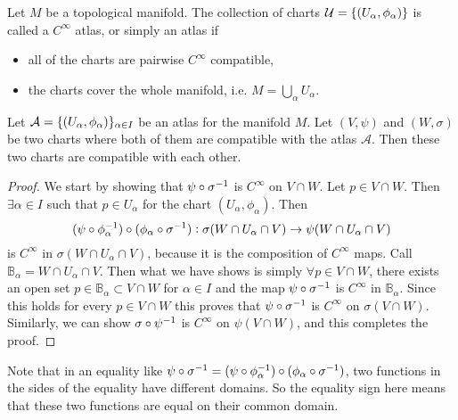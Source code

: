 \begin{definition}
	Let $ M $ be a topological manifold. The collection of charts $ \mathcal{U} = \{(U_\alpha, \phi_\alpha)\} $ is called a $ C^\infty $ atlas, or simply an atlas if 
	\begin{itemize}
		\item all of the charts are pairwise $ C^\infty $ compatible,
		\item the charts cover the whole manifold, i.e. $ M = \bigcup_\alpha U_\alpha $.
	\end{itemize}
\end{definition}

\begin{lemma}
	Let $ \mathcal{A} = \{(U_\alpha,\phi_\alpha)\}_{\alpha \in I} $ be an atlas for the manifold $ M $. Let $ (V,\psi) $ and $ (W,\sigma) $ be two charts where both of them are compatible with the atlas $ \mathcal{A} $. Then these two charts are compatible with each other.
\end{lemma}

\begin{proof}
	We start by showing that $ \psi\circ \sigma^{-1} $ is $ C^\infty $ on $ V\cap W $. Let $ p \in V \cap W $. Then $ \exists \alpha \in I $ such that $ p \in U_\alpha $ for the chart $ (U_\alpha,\phi_\alpha) $. Then 
	\[ (\psi \circ \phi_\alpha^{-1})\circ (\phi_\alpha \circ \sigma^{-1}): \sigma(W\cap U_\alpha \cap V) \to \psi(W \cap U_\alpha \cap V) \]
	is $ C^\infty $ in $ \sigma(W\cap U_\alpha \cap V) $, because it is the composition of $ C^\infty $ maps. Call $ \mathbb{B}_\alpha  = W\cap U_\alpha \cap V $. Then what we have shows is simply $ \forall p \in V \cap W $, there exists an open set $ p \in \mathbb{B}_\alpha \subset V\cap W $ for $  \alpha \in I $ and the map $ \psi \circ \sigma^{-1}  $ is $ C^\infty $ in $ \mathbb{B}_\alpha $. Since this holds for every $ p \in V \cap W $ this proves that $ \psi\circ \sigma^{-1} $ is $ C^\infty $ on $ \sigma (V\cap W) $. Similarly, we can show $ \sigma \circ \psi^{-1} $ is $ C^\infty $ on $ \psi(V\cap W) $, and this completes the proof.
\end{proof}

\begin{remark}
	Note that in an equality like $ \psi \circ \sigma^{-1} =(\psi \circ \phi_\alpha^{-1})\circ (\phi_\alpha \circ \sigma^{-1}) $, two functions in the sides of the equality have different domains. So the equality sign here means that these two functions are equal on their common domain.
\end{remark}


